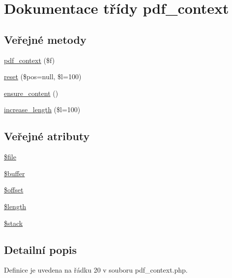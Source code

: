 \hypertarget{classpdf__context}{\section{Dokumentace třídy pdf\-\_\-context}
\label{classpdf__context}
}
\subsection*{Veřejné metody}
\begin{DoxyCompactItemize}
\item 
\hyperlink{classpdf__context_ac669db6d1030f4cb22c56eb874dda973}{pdf\-\_\-context} (\$f)
\item 
\hyperlink{classpdf__context_a79f0455bd33515cbd963f4e28fc5fd96}{reset} (\$pos=null, \$l=100)
\item 
\hyperlink{classpdf__context_a0aff10ae34b47a61696718cd13507e6c}{ensure\-\_\-content} ()
\item 
\hyperlink{classpdf__context_aec526f767f7fac7678fce3e0798bc410}{increase\-\_\-length} (\$l=100)
\end{DoxyCompactItemize}
\subsection*{Veřejné atributy}
\begin{DoxyCompactItemize}
\item 
\hyperlink{classpdf__context_a3d6ba2934185f7ebf05680363de0ee4b}{\$file}
\item 
\hyperlink{classpdf__context_afa8b3f5ac84d597210167e39c43934c1}{\$buffer}
\item 
\hyperlink{classpdf__context_a7828e31df2fad7482aed65e6b013d5f9}{\$offset}
\item 
\hyperlink{classpdf__context_a4a7032914ef01157088fc29e2e228bc0}{\$length}
\item 
\hyperlink{classpdf__context_aa3022de04734387611e7f834c17fd19b}{\$stack}
\end{DoxyCompactItemize}


\subsection{Detailní popis}


Definice je uvedena na řádku 20 v souboru pdf\-\_\-context.\-php.



